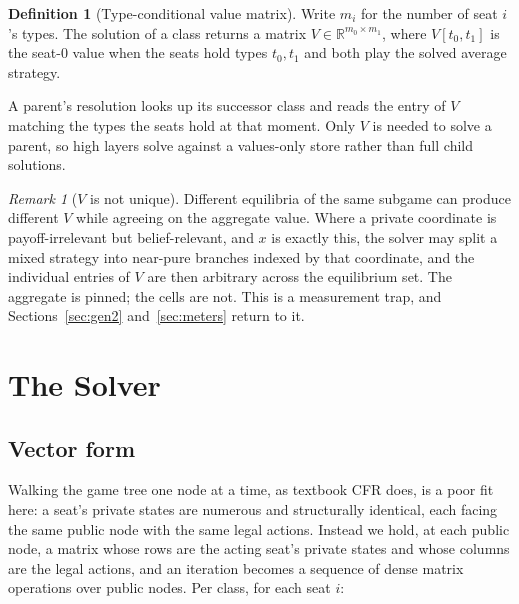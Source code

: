 \documentclass[11pt]{article}
\theoremstyle{plain}
\theoremstyle{definition}
\newtheorem{definition}[theorem]{Definition}
\theoremstyle{remark}
\newtheorem{remark}[theorem]{Remark}
\begin{document}
\begin{definition}[Type-conditional value matrix]\label{def:vtypes}
Write $m_i$ for the number of seat $i$'s types. The solution of a class
returns a matrix $V\in\mathbb{R}^{m_0\times m_1}$, where $V[t_0,t_1]$ is
the seat-$0$ value when the seats hold types $t_0,t_1$ and both play the
solved average strategy.
\end{definition}

A parent's resolution looks up its successor class and reads the entry of $V$
matching the types the seats hold at that moment. Only $V$ is needed to solve a
parent, so high layers solve against a values-only store rather than full child
solutions.

\begin{remark}[$V$ is not unique]\label{rem:vnotunique}
Different equilibria of the same subgame can produce different $V$ while
agreeing on the aggregate value. Where a private coordinate is
payoff-irrelevant but belief-relevant, and $x$ is exactly this, the
solver may split a mixed strategy into near-pure branches indexed by
that coordinate, and the individual entries of $V$ are then arbitrary
across the equilibrium set. The aggregate is pinned; the cells are not.
This is a measurement trap, and Sections~\ref{sec:gen2}
and~\ref{sec:meters} return to it.
\end{remark}

\section{The Solver}\label{sec:solver}

\subsection{Vector form}\label{sec:vector}

Walking the game tree one node at a time, as textbook CFR does, is a poor fit
here: a seat's private states are numerous and structurally identical, each
facing the same public node with the same legal actions. Instead we hold, at
each public node, a matrix whose rows are the acting seat's private states and
whose columns are the legal actions, and an iteration becomes a sequence of
dense matrix operations over public nodes. Per class, for each seat $i$:
\end{document}
